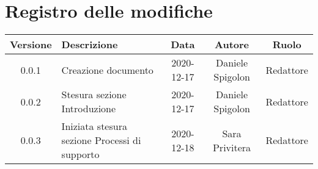 \section*{Registro delle modifiche}

\begin{center}
	\begin{longtable}{|c|p{5cm}|c|c|c|}
	\hline
	\rowcolor{lighter-grayer}
	\textbf{Versione} & \textbf{Descrizione} & \textbf{Data} & \textbf{Autore} & \textbf{Ruolo} \\
	\hline
	\endfirsthead


	0.0.1 & Creazione documento & 2020-12-17 & Daniele Spigolon & Redattore \\
	\hline
	0.0.2 & Stesura sezione Introduzione & 2020-12-17 & Daniele Spigolon & Redattore \\
	\hline
	0.0.3 & Iniziata stesura sezione Processi di supporto & 2020-12-18 & Sara Privitera & Redattore \\
	\hline

	\end{longtable}
\end{center}